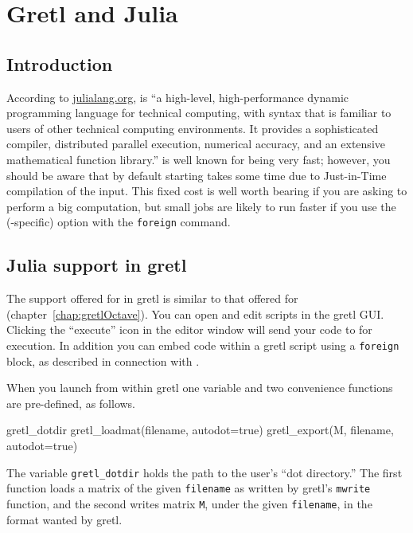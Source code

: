\chapter{Gretl and Julia}
\label{chap:gretlJulia}

\section{Introduction}
\label{Julia-intro}

According to \url{julialang.org},  is ``a high-level,
high-performance dynamic programming language for technical computing,
with syntax that is familiar to users of other technical computing
environments. It provides a sophisticated compiler, distributed
parallel execution, numerical accuracy, and an extensive mathematical
function library.''  is well known for being very fast;
however, you should be aware that by default starting 
takes some time due to Just-in-Time compilation of the input. This
fixed cost is well worth bearing if you are asking  to
perform a big computation, but small jobs are likely to run faster
if you use the (-specific)  option
with the \texttt{foreign} command.

\section{Julia support in gretl}
\label{sec:Julia-support}

The support offered for  in gretl is similar to that
offered for  (chapter~\ref{chap:gretlOctave}). You can
open and edit  scripts in the gretl GUI.  Clicking
the ``execute'' icon in the editor window will send your code to
 for execution. In addition you can embed 
code within a gretl script using a \texttt{foreign} block, as
described in connection with .

When you launch  from within gretl one variable and
two convenience functions are pre-defined, as follows.
\begin{code}
gretl_dotdir
gretl_loadmat(filename, autodot=true)
gretl_export(M, filename, autodot=true)
\end{code}
The variable \verb|gretl_dotdir| holds the path to the user's ``dot
directory.''  The first function loads a matrix of the given
\texttt{filename} as written by gretl's \texttt{mwrite}
function, and the second writes matrix \texttt{M}, under the given
\texttt{filename}, in the format wanted by gretl.

